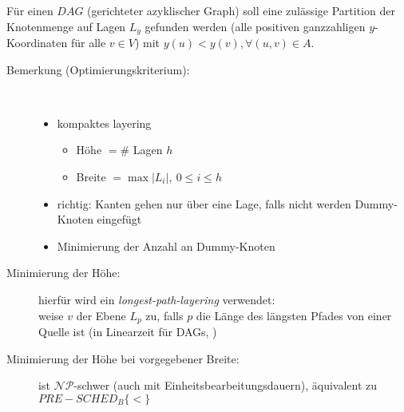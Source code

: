 Für einen $DAG$ (gerichteter azyklischer Graph) soll eine zulässige Partition der Knotenmenge auf Lagen $L_y$ gefunden werden (alle positiven ganzzahligen $y$-Koordinaten für alle $v\in V$) mit $y(u)<y(v), \forall (u,v)\in A$.
\begin{description}
	\item[Bemerkung (Optimierungskriterium):] \ \\\vspace*{-\baselineskip}
		\begin{itemize}
			\item kompaktes layering
				\begin{itemize}
					\item Höhe $=\#$ Lagen $h$
					\item Breite $=\max|L_i|,~0\leq i\leq h$
				\end{itemize}
			\item \glqq richtig\grqq: Kanten gehen nur über eine Lage, falls nicht werden Dummy-Knoten eingefügt
			\item Minimierung der Anzahl an Dummy-Knoten
		\end{itemize}
	\item[Minimierung der Höhe:] hierfür wird ein \textit{longest-path-layering} verwendet:\\
		weise $v$ der Ebene $L_p$ zu, falls $p$ die Länge des längsten Pfades von einer Quelle ist (in Linearzeit für DAGs, )
	\item[Minimierung der Höhe bei vorgegebener Breite:] ist $\mathcal{NP}$-schwer (auch mit Einheitsbearbeitungsdauern), äquivalent zu $PRE-SCHED_B\{<\}$
\end{description}
\topbreak
\vspace*{-2\baselineskip}
